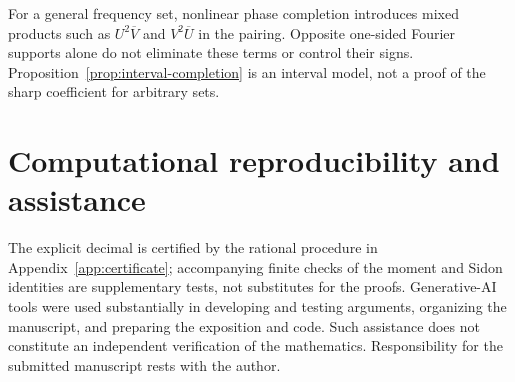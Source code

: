 \documentclass[11pt,reqno]{amsart}
\numberwithin{equation}{section}
\theoremstyle{definition}
\theoremstyle{remark}
\begin{document}
For a general frequency set, nonlinear phase completion introduces
mixed products such as $U^2\overline V$ and $V^2\overline U$ in the
pairing. Opposite one-sided Fourier supports alone do not eliminate
these terms or control their signs. Proposition~\ref{prop:interval-completion}
is an interval model, not a proof of the sharp coefficient for arbitrary
sets.

\section*{Computational reproducibility and assistance}
The explicit decimal is certified by the rational procedure in
Appendix~\ref{app:certificate}; accompanying finite checks of the
moment and Sidon identities are supplementary tests, not substitutes
for the proofs. Generative-AI tools were used substantially in developing
and testing arguments, organizing the manuscript, and preparing the
exposition and code. Such assistance does not constitute an independent
verification of the mathematics. Responsibility for the submitted
manuscript rests with the author.
\end{document}
